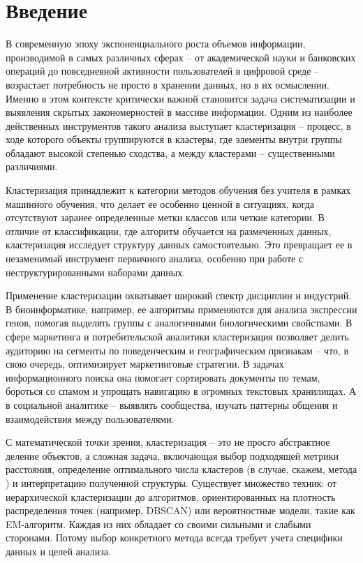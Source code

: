 \setcounter{page}{2}
\tableofcontents

\newpage

\section{Введение}

    В современную эпоху экспоненциального роста объемов информации, производимой в самых различных сферах -- от академической науки и банковских операций до повседневной активности пользователей в цифровой среде -- возрастает потребность не просто в хранении данных, но в их осмыслении. Именно в этом контексте критически важной становится задача систематизации и выявления скрытых закономерностей в массиве информации. Одним из наиболее действенных инструментов такого анализа выступает кластеризация -- процесс, в ходе которого объекты группируются в кластеры, где элементы внутри группы обладают высокой степенью сходства, а между кластерами -- существенными различиями.

    Кластеризация принадлежит к категории методов обучения без учителя в рамках машинного обучения, что делает ее особенно ценной в ситуациях, когда отсутствуют заранее определенные метки классов или четкие категории. В отличие от классификации, где алгоритм обучается на размеченных данных, кластеризация исследует структуру данных самостоятельно. Это превращает ее в незаменимый инструмент первичного анализа, особенно при работе с неструктурированными наборами данных.

    Применение кластеризации охватывает широкий спектр дисциплин и индустрий. В биоинформатике, например, ее алгоритмы применяются для анализа экспрессии генов, помогая выделять группы с аналогичными биологическими свойствами. В сфере маркетинга и потребительской аналитики кластеризация позволяет делить аудиторию на сегменты по поведенческим и географическим признакам -- что, в свою очередь, оптимизирует маркетинговые стратегии. В задачах информационного поиска она помогает сортировать документы по темам, бороться со спамом и упрощать навигацию в огромных текстовых хранилищах. А в социальной аналитике -- выявлять сообщества, изучать паттерны общения и взаимодействия между пользователями.

    С математической точки зрения, кластеризация -- это не просто абстрактное деление объектов, а сложная задача, включающая выбор подходящей метрики расстояния, определение оптимального числа кластеров (в случае, скажем, метода \kmeans{}) и интерпретацию полученной структуры. Существует множество техник: от иерархической кластеризации до алгоритмов, ориентированных на плотность распределения точек (например, DBSCAN) или вероятностные модели, такие как EM-алгоритм. Каждая из них обладает со своими сильными и слабыми сторонами. Потому выбор конкретного метода всегда требует учета специфики данных и целей анализа.

